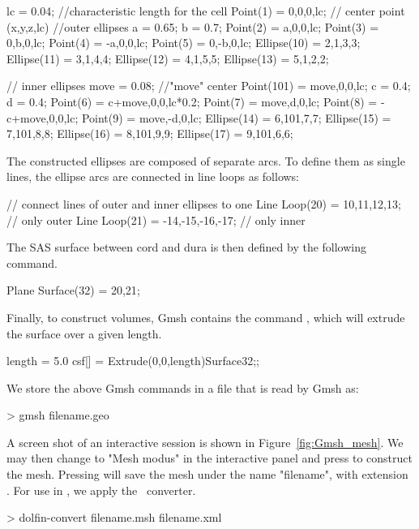 \begin{gencode}
lc = 0.04;  //characteristic length for the cell
Point(1) = {0,0,0,lc};	// center point (x,y,z,lc)
//outer ellipses
a = 0.65;
b = 0.7;
Point(2) = {a,0,0,lc};
Point(3) = {0,b,0,lc};
Point(4) = {-a,0,0,lc};
Point(5) = {0,-b,0,lc};
Ellipse(10) = {2,1,3,3};
Ellipse(11) = {3,1,4,4};
Ellipse(12) = {4,1,5,5};
Ellipse(13) = {5,1,2,2};

// inner ellipses
move = 0.08; //"move" center
Point(101) = {move,0,0,lc};
c = 0.4;
d = 0.4;
Point(6) = {c+move,0,0,lc*0.2};
Point(7) = {move,d,0,lc};
Point(8) = {-c+move,0,0,lc};
Point(9) = {move,-d,0,lc};
Ellipse(14) = {6,101,7,7};
Ellipse(15) = {7,101,8,8};
Ellipse(16) = {8,101,9,9};
Ellipse(17) = {9,101,6,6};
\end{gencode}

The constructed ellipses are composed of separate arcs. To define them
as single lines, the ellipse arcs are connected in line loops as
follows:

\begin{gencode}
// connect lines of outer and inner ellipses to one
Line Loop(20) = {10,11,12,13};		// only outer
Line Loop(21) = {-14,-15,-16,-17};	// only inner
\end{gencode}
The SAS surface between cord and dura is then defined by the following command.
\begin{gencode}
Plane Surface(32) = {20,21};
\end{gencode}

Finally, to construct volumes, Gmsh contains the command , which will extrude the surface over a given length.
\begin{gencode}
length = 5.0
csf[] = Extrude(0,0,length){Surface{32};};
\end{gencode}

We store the above Gmsh commands in a  file that is read by Gmsh as:
\begin{bash}
> gmsh filename.geo
\end{bash}
A screen shot of an interactive session is shown in
Figure~\ref{fig:Gmsh_mesh}.  We may then change to "Mesh modus" in the
interactive panel and press  to construct the
mesh. Pressing  will save the mesh under the name
"filename", with extension . For use in \dolfin, we apply
the \dolfin\ converter.

\begin{bash}
> dolfin-convert filename.msh filename.xml
\end{bash}

